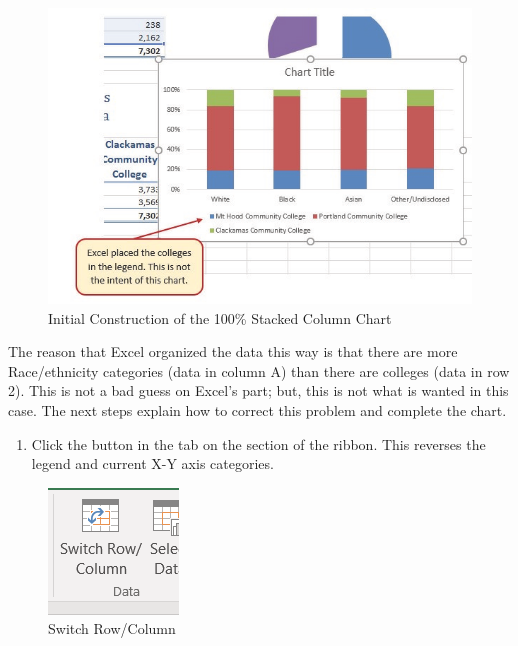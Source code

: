 \begin{figure}[H]
	\centering
	\includegraphics[width=\maxwidth{.95\linewidth}]{gfx/ch04_fig24}
	\caption{Initial Construction of the 100\% Stacked Column Chart}
	\label{04:fig24}
\end{figure}

The reason that Excel organized the data this way is that there are more Race/ethnicity categories (data in column A) than there are colleges (data in row 2). This is not a bad guess on Excel's part; but, this is not what is wanted in this case. The next steps explain how to correct this problem and complete the chart.

\begin{enumerate}
	\item Click the  button in the  tab on the  section of the ribbon. This reverses the legend and current X-Y axis categories.
\end{enumerate}

\begin{figure}[H]
	\centering
	\includegraphics[width=\maxwidth{.95\linewidth}]{gfx/ch04_fig25}
	\caption{Switch Row/Column}
	\label{04:fig25}
\end{figure}

